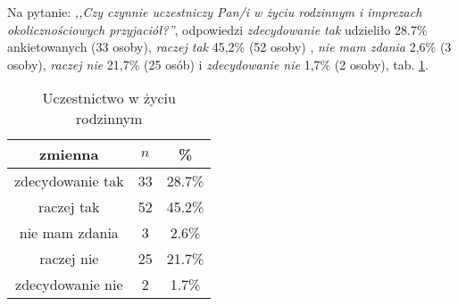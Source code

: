 Na pytanie: \textit{,,Czy czynnie uczestniczy Pan/i w życiu rodzinnym i imprezach okolicznościowych przyjaciół?''}, odpowiedzi \textit{zdecydowanie tak} udzieliło 28.7\% ankietowanych (33 osoby), \textit{raczej tak} 45,2\% (52 osoby) , \textit{nie mam zdania} 2,6\% (3 osoby), \textit{raczej nie} 21,7\% (25 osób) i \textit{zdecydowanie nie} 1,7\% (2 osoby), tab. \ref{tab:Q24}.

\begin{table}[H]
\caption{Uczestnictwo w życiu rodzinnym}
\centering
\begin{tabular}{ | c | c | c |}
\hline
zmienna & $n$ & \% \\
\hline
zdecydowanie tak  &  33  & 28.7\% \\
\hline
raczej tak  &  52  & 45.2\% \\
\hline
nie mam zdania  &  3  & 2.6\% \\
\hline
raczej nie  &  25  & 21.7\% \\
\hline
zdecydowanie nie  &  2  & 1.7\% \\
\hline
\end{tabular}
\label{tab:Q24}
\end{table}
